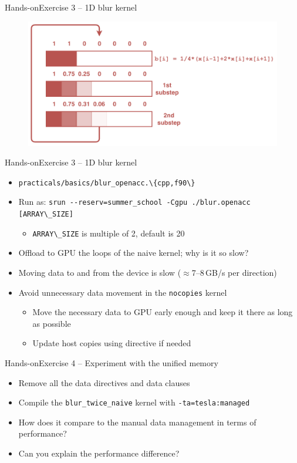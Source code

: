 \documentclass[12pt,aspectratio=169]{beamer}
\newcommand\shinline[2][]{\lstinline[style=shstyle,basicstyle=\ttfamily,#1]!#2!}
\begin{document}
\begin{frame}{Hands-on}{Exercise 3 -- 1D blur kernel}
  \begin{figure}
    \centering
    \includegraphics[width=.7\textwidth]{blur_twice_kernel}
  \end{figure}
\end{frame}


\begin{frame}{Hands-on}{Exercise 3 -- 1D blur kernel}
  \begin{itemize}
  \item \shinline{practicals/basics/blur_openacc.\{cpp,f90\}}
  \item Run as: \shinline{srun --reserv=summer_school -Cgpu ./blur.openacc [ARRAY\_SIZE]}
    \begin{itemize}
    \item \shinline{ARRAY\_SIZE} is multiple of 2, default is 20
    \end{itemize}
  \item Offload to GPU the loops of the naive kernel; why is it so slow?
    \pause
    \vfill
  \item Moving data to and from the device is slow ($\approx$7--8\,GB/s per direction)
  \item Avoid unnecessary data movement in the \texttt{nocopies} kernel
    \begin{itemize}
    \item Move the necessary data to GPU early enough and keep it there as long as possible
    \item Update host copies using  directive if needed
    \end{itemize}
  \end{itemize}
\end{frame}


\begin{frame}{Hands-on}{Exercise 4 -- Experiment with the unified memory}
  \begin{itemize}
  \item Remove all the data directives and data clauses
  \item Compile the \texttt{blur\_twice\_naive} kernel with \texttt{-ta=tesla:managed}
  \item How does it compare to the manual data management in terms of performance?
  \item Can you explain the performance difference?
  \end{itemize}
\end{frame}
\end{document}
